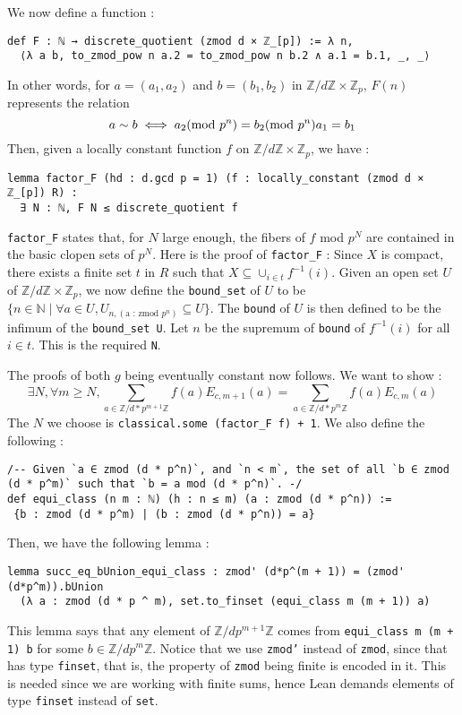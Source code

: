 \documentclass[a4paper,UKenglish,cleveref, autoref, thm-restate]{lipics-v2021}
\newcommand{\lean}[1]{\texttt{#1}\xspace} %
\begin{document}
We now define a function : 
\begin{lstlisting}
def F : ℕ → discrete_quotient (zmod d × ℤ_[p]) := λ n, 
  ⟨λ a b, to_zmod_pow n a.2 = to_zmod_pow n b.2 ∧ a.1 = b.1, _, _⟩
\end{lstlisting}

In other words, for $a = (a_1, a_2)$ and $b = (b_1, b_2)$ in $\mathbb{Z}/d \mathbb{Z} \times \mathbb{Z}_p$, $F(n)$ represents the relation 
$$ a \sim b \iff a_2 (\text{mod } p^n) = b_2 (\text{mod } p^n) \and a_1 = b_1 $$
Then, given a locally constant function $f$ on $\mathbb{Z}/d \mathbb{Z} \times \mathbb{Z}_p$, we have :
\begin{lstlisting}
lemma factor_F (hd : d.gcd p = 1) (f : locally_constant (zmod d × ℤ_[p]) R) :
  ∃ N : ℕ, F N ≤ discrete_quotient f
\end{lstlisting}

\lean{factor\_F} states that, for $N$ large enough, the fibers of $f$ mod $p^N$ are contained in the basic clopen sets of $p^N$. 
Here is the proof of \lean{factor\_F} : Since $X$ is compact, there exists a finite set $t$ in $R$ such that $X \subseteq \cup_{i \in t} f^{-1} (i)$. 
Given an open set $U$ of $\mathbb{Z}/d \mathbb{Z} \times \mathbb{Z}_p$, we now define the \lean{bound\_set} of $U$ to be 
\newline $\{ n \in \mathbb{N} \mid \forall a \in U, U_{n, (\text{a : zmod }p^n)} \subseteq U \}$. The \lean{bound} of $U$ is then defined to be the infimum of the \lean{bound\_set U}. 
Let $n$ be the supremum of \lean{bound} of $f^{-1} (i)$ for all $i \in t$. This is the required \lean{N}. 

The proofs of both $g$ being eventually constant now follows. We want to show : 
$$ \exists N, \forall m \ge N, \sum_{a \in \mathbb{Z}/d*p^{m + 1} \mathbb{Z}} f(a) E_{c,m + 1}(a) = \sum_{a \in \mathbb{Z}/d*p^{m} \mathbb{Z}} f(a) E_{c,m}(a) $$
The $N$ we choose is \lean{classical.some (factor\_F f) + 1}. We also define the following : 
\begin{lstlisting}
/-- Given `a ∈ zmod (d * p^n)`, and `n < m`, the set of all `b ∈ zmod (d * p^m)` such that `b = a mod (d * p^n)`. -/
def equi_class (n m : ℕ) (h : n ≤ m) (a : zmod (d * p^n)) :=
 {b : zmod (d * p^m) | (b : zmod (d * p^n)) = a}
\end{lstlisting}
Then, we have the following lemma :
\begin{lstlisting}
lemma succ_eq_bUnion_equi_class : zmod' (d*p^(m + 1)) = (zmod' (d*p^m)).bUnion
  (λ a : zmod (d * p ^ m), set.to_finset (equi_class m (m + 1)) a) 
\end{lstlisting}
This lemma says that any element of $\mathbb{Z}/dp^{m + 1} \mathbb{Z}$ comes from \lean{equi\_class m (m + 1) b} for some $b \in \mathbb{Z}/dp^m \mathbb{Z}$. 
Notice that we use \lean{zmod'} instead of \lean{zmod}, since that has type \lean{finset}, that is, the property of \lean{zmod} being finite is encoded in it. This 
is needed since we are working with finite sums, hence Lean demands elements of type \lean{finset} instead of \lean{set}. 
\end{document}
